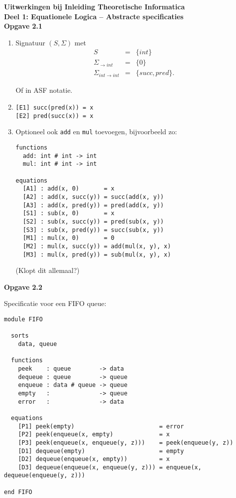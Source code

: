 \documentclass[a4paper,11pt]{article}
\begin{document}
{\bf Uitwerkingen bij Inleiding Theoretische Informatica\\
Deel 1: Equationele Logica -- Abstracte specificaties}\\[2em]


{\bf Opgave 2.1}

\begin{enumerate}

\item %
Signatuur $(S, \Sigma)$ met
\begin{eqnarray*}
S & = & \{int\} \\
\Sigma_{\rightarrow int} & = & \{0\} \\
\Sigma_{int \rightarrow int} & = & \{succ, pred\}.
\end{eqnarray*}

Of in ASF notatie.

\item %
\begin{verbatim}
[E1] succ(pred(x)) = x
[E2] pred(succ(x)) = x
\end{verbatim}

\item %
Optioneel ook \verb|add| en \verb|mul| toevoegen, bijvoorbeeld zo:

\begin{verbatim}
functions
  add: int # int -> int
  mul: int # int -> int

equations
  [A1] : add(x, 0)       = x
  [A2] : add(x, succ(y)) = succ(add(x, y))
  [A3] : add(x, pred(y)) = pred(add(x, y))
  [S1] : sub(x, 0)       = x
  [S2] : sub(x, succ(y)) = pred(sub(x, y))
  [S3] : sub(x, pred(y)) = succ(sub(x, y))
  [M1] : mul(x, 0)       = 0
  [M2] : mul(x, succ(y)) = add(mul(x, y), x)
  [M3] : mul(x, pred(y)) = sub(mul(x, y), x)
\end{verbatim}

(Klopt dit allemaal?)

\end{enumerate}


{\bf Opgave 2.2} %

Specificatie voor een FIFO queue:

\begin{verbatim}
module FIFO

  sorts
    data, queue

  functions
    peek    : queue        -> data
    dequeue : queue        -> queue
    enqueue : data # queue -> queue
    empty   :              -> queue
    error   :              -> data

  equations
    [P1] peek(empty)                        = error
    [P2] peek(enqueue(x, empty)             = x
    [P3] peek(enqueue(x, enqueue(y, z)))    = peek(enqueue(y, z))
    [D1] dequeue(empty)                     = empty
    [D2] dequeue(enqueue(x, empty))         = x
    [D3] dequeue(enqueue(x, enqueue(y, z))) = enqueue(x, dequeue(enqueue(y, z)))

end FIFO
\end{verbatim}
\end{document}
